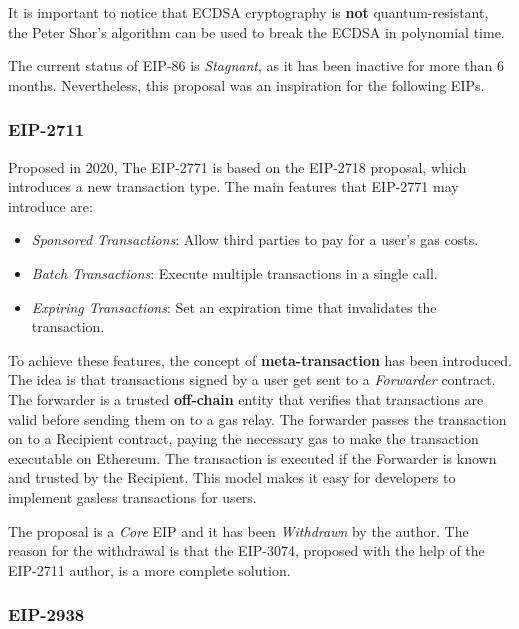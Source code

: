 It is important to notice that ECDSA cryptography is \textbf{not} quantum-resistant, the Peter Shor's algorithm can be used to break the ECDSA in polynomial time. \cite{stewart2018committing}

The current status of EIP-86 is \textit{Stagnant}, as it has been inactive for more than 6 months. Nevertheless, this proposal was an inspiration for the following EIPs.

\subsubsection{EIP-2711} %
\label{subsubsec:eip-2711}

Proposed in 2020, The EIP-2771 is based on the EIP-2718 proposal, which introduces a new transaction type. The main features that EIP-2771 may introduce are: \cite{eip-2711} 

\begin{itemize}
    \item \textit{Sponsored Transactions}: Allow third parties to pay for a user's gas costs.
    \item \textit{Batch Transactions}: Execute multiple transactions in a single call.
    \item \textit{Expiring Transactions}: Set an expiration time that invalidates the transaction.
\end{itemize}

To achieve these features, the concept of \textbf{meta-transaction} has been introduced. The idea is that transactions signed by a user get sent to a \textit{Forwarder} contract. The forwarder is a trusted \textbf{off-chain} entity that verifies that transactions are valid before sending them on to a gas relay. The forwarder passes the transaction on to a Recipient contract, paying the necessary gas to make the transaction executable on Ethereum. The transaction is executed if the Forwarder is known and trusted by the Recipient. This model makes it easy for developers to implement gasless transactions for users. \cite{ethereum-account-abstraction}

The proposal is a \textit{Core} EIP and it has been \textit{Withdrawn} by the author. The reason for the withdrawal is that the EIP-3074, proposed with the help of the EIP-2711 author, is a more complete solution. \cite{eip-2711}

\subsubsection{EIP-2938}
\label{subsubsec:eip-2938}

